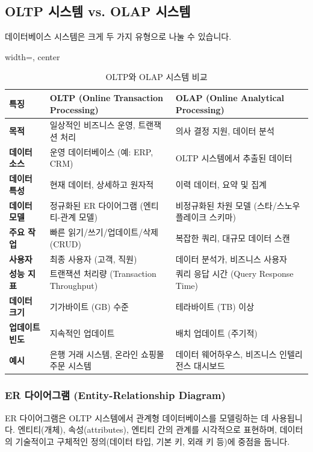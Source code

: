 \documentclass[11pt,a4paper]{article}
\theoremstyle{definition}
\begin{document}
\subsection{OLTP 시스템 vs. OLAP 시스템}

데이터베이스 시스템은 크게 두 가지 유형으로 나눌 수 있습니다.

\begin{table}[h!]
\centering
\caption{OLTP와 OLAP 시스템 비교}
\label{tab:oltp_olap_comparison}
\begin{adjustbox}{width=\textwidth, center}
\begin{tabular}{p{}p{}p{}}
\toprule
\textbf{특징} & \textbf{OLTP (Online Transaction Processing)} & \textbf{OLAP (Online Analytical Processing)} \\
\midrule
\textbf{목적} & 일상적인 비즈니스 운영, 트랜잭션 처리 & 의사 결정 지원, 데이터 분석 \\
\textbf{데이터 소스} & 운영 데이터베이스 (예: ERP, CRM) & OLTP 시스템에서 추출된 데이터 \\
\textbf{데이터 특성} & 현재 데이터, 상세하고 원자적 & 이력 데이터, 요약 및 집계 \\
\textbf{데이터 모델} & 정규화된 ER 다이어그램 (엔티티-관계 모델) & 비정규화된 차원 모델 (스타/스노우플레이크 스키마) \\
\textbf{주요 작업} & 빠른 읽기/쓰기/업데이트/삭제 (CRUD) & 복잡한 쿼리, 대규모 데이터 스캔 \\
\textbf{사용자} & 최종 사용자 (고객, 직원) & 데이터 분석가, 비즈니스 사용자 \\
\textbf{성능 지표} & 트랜잭션 처리량 (Transaction Throughput) & 쿼리 응답 시간 (Query Response Time) \\
\textbf{데이터 크기} & 기가바이트 (GB) 수준 & 테라바이트 (TB) 이상 \\
\textbf{업데이트 빈도} & 지속적인 업데이트 & 배치 업데이트 (주기적) \\
\textbf{예시} & 은행 거래 시스템, 온라인 쇼핑몰 주문 시스템 & 데이터 웨어하우스, 비즈니스 인텔리전스 대시보드 \\
\bottomrule
\end{tabular}
\end{adjustbox}
\end{table}

\subsubsection{ER 다이어그램 (Entity-Relationship Diagram)}
ER 다이어그램은 OLTP 시스템에서 관계형 데이터베이스를 모델링하는 데 사용됩니다. 엔티티(개체), 속성(attributes), 엔티티 간의 관계를 시각적으로 표현하며, 데이터의 기술적이고 구체적인 정의(데이터 타입, 기본 키, 외래 키 등)에 중점을 둡니다.
\end{document}
